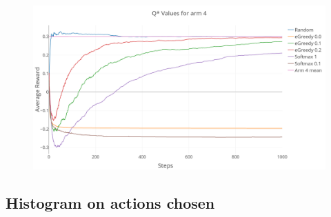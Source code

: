 \documentclass[a4paper, 11pt]{article}
\begin{document}
\begin{figure}[H]
	\centering
    \includegraphics[width=1\linewidth]{ex1_Q4_reward}
\end{figure}

\subsection{Histogram on actions chosen}
\end{document}

